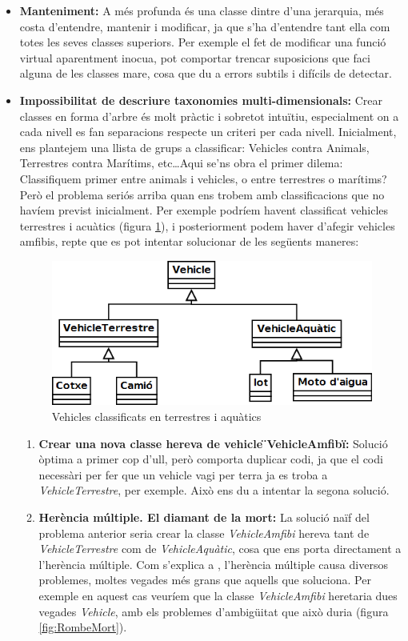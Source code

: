 \begin{itemize}
  \item {\bf Manteniment:} A més profunda és una classe dintre d'una jerarquia, més costa d'entendre, mantenir i modificar, ja que s'ha d'entendre tant ella com totes les seves classes superiors. Per exemple el fet de modificar una funció virtual aparentment inocua, pot comportar trencar suposicions que faci alguna de les classes mare, cosa que du a errors subtils i difícils de detectar.
    
  \item {\bf Impossibilitat de descriure taxonomies multi-dimensionals:} Crear classes en forma d'arbre és molt pràctic i sobretot intuïtiu, especialment on a cada nivell es fan separacions respecte un criteri per cada nivell. Inicialment, ens plantejem una llista de grups a classificar: Vehicles contra Animals, Terrestres contra Marítims, etc\ldots Aqui se'ns obra el primer dilema: Classifiquem primer entre animals i vehicles, o entre terrestres o marítims? Però el problema seriós arriba quan ens trobem amb classificacions que no havíem previst inicialment. Per exemple podríem havent classificat vehicles terrestres i acuàtics (figura \ref{fig:Vehicles}), i posteriorment podem haver d'afegir vehicles amfibis, repte que es pot intentar solucionar de les següents maneres:
  
  \begin{figure}
    \centering
    \includegraphics[width=0.58\linewidth]{./img/Vehicles.png}
    \caption{Vehicles classificats en terrestres i aquàtics \label{fig:Vehicles}}
  \end{figure}
  
    \begin{enumerate}
      \item {\bf Crear una nova classe hereva de vehicle \"{}VehicleAmfibi\"{}:} Solució òptima a primer cop d'ull, però comporta duplicar codi, ja que el codi necessàri per fer que un vehicle vagi per terra ja es troba a {\em VehicleTerrestre}, per exemple. Això ens du a intentar la segona solució.
      
      \item {\bf Herència múltiple. El diamant de la mort:} La solució naïf del problema anterior seria crear la classe {\em VehicleAmfibi} hereva tant de {\em VehicleTerrestre} com de {\em VehicleAquàtic}, cosa que ens porta directament a l'herència múltiple. Com s'explica a \cite[p.~2]{Martin97}, l'herència múltiple causa diversos problemes, moltes vegades més grans que aquells que soluciona. Per exemple en aquest cas veuríem que la classe {\em VehicleAmfibi} heretaria dues vegades {\em Vehicle}, amb els problemes d'ambigüitat que això duria (figura \ref{fig:RombeMort}).
        

\end{enumerate}
\end{itemize}
